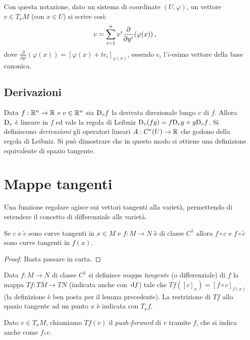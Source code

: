 Con questa notazione, dato un sistema di coordinate $(U,\varphi)$, un vettore $v\in T_x M$ (con $x\in U$) si scrive così:
\begin{equation*}
	v=\sum_{i=1}^nv^i\frac{\partial}{\partial y^i}(\varphi(x))\, \text{, }
\end{equation*}
dove $\frac{\partial}{\partial y^i}(\varphi(x))=[\varphi(x)+te_i]_{\varphi(x)}$, essendo $e_i$ l'$i$-esimo vettore della base canonica.

\subsection{Derivazioni} 
Data $f:\mathbb R^n\to\mathbb R$ e $v\in\mathbb R^n$ sia $\mathrm D_vf$ la derivata direzionale lungo $v$ di $f$. Allora $\mathrm D_v$ è lineare in $f$ ed vale la regola di Leibniz $\mathrm D_v(fg)=f\mathrm D_vg+g\mathrm D_vf$. Si definiscono \emph{derivazioni} gli operatori lineari $A:C^r(U)\to\mathbb R$ che godono della regola di Leibniz. Si può dimostrare che in questo modo si ottiene una definizione equivalente di spazio tangente.
 
\section{Mappe tangenti}
Una funzione regolare agisce sui vettori tangenti alla varietà, permettendo di estendere il concetto di differenziale alle varietà.
 
\begin{lemma}
	Se $c$ e $\tilde{c}$ sono curve tangenti in $x\in M$ e $f:M\to N$ è di classe $C^1$ allora $f\circ c$ e $f\circ\tilde{c}$ sono curve tangenti in $f(x)$.
\end{lemma}

 \begin{proof}
  Basta passare in carta.
 \end{proof}

\begin{definition} 
	Data $f:M\to N$ di classe $C^1$ si definisce \emph{mappa tangente} (o differenziale) di $f$ la mappa $Tf:TM\to TN$ (indicata anche con $\,\mathrm d f$) tale che $Tf([c]_x)=[f\circ c]_{f(x)}$ (la definizione è ben posta per il lemma precedente).
	La restrizione di $Tf$ allo spazio tangente ad un punto $x$ è indicata con $T_xf$.
\end{definition}

\begin{remark}
	Dato $v\in T_xM$, chiamiamo $Tf(v)$ il \emph{push-forward} di $v$ tramite $f$, che si indica anche come $f_*v$. 
\end{remark}


